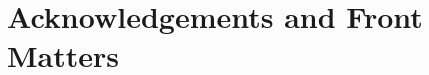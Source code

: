 \documentclass[11pt,fleqn, openany]{book} %
\begin{document}
\frontmatter
%

%


\part{Acknowledgements and Front Matters}





\linespread{1.15} %





\pagestyle{empty} %

\tableofcontents %

\cleardoublepage %

\pagestyle{fancy} %

\pagebreak
\end{document}
